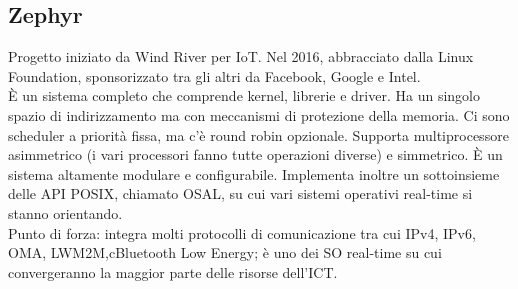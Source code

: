 \documentclass[18px]{article}
\begin{document}
\subsection{Zephyr}
Progetto iniziato da Wind River per IoT. Nel 2016, abbracciato dalla Linux Foundation, sponsorizzato tra gli altri da Facebook, Google e Intel.\\ È un sistema completo che comprende kernel, librerie e driver. Ha un singolo spazio di indirizzamento ma con meccanismi di protezione della memoria. Ci sono scheduler a priorità fissa, ma c'è round robin opzionale. Supporta multiprocessore asimmetrico (i vari processori fanno tutte operazioni diverse) e simmetrico. È un sistema altamente modulare e configurabile. Implementa inoltre un sottoinsieme delle API POSIX, chiamato OSAL, su cui vari sistemi operativi real-time si stanno orientando.\\ Punto di forza: integra molti protocolli di comunicazione tra cui IPv4, IPv6, OMA, LWM2M,cBluetooth Low Energy; è uno dei SO real-time su cui convergeranno la maggior parte delle risorse dell'ICT.
\end{document}
